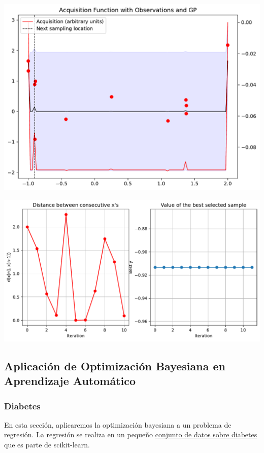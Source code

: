 \documentclass[
  12pt,
  letterpaper,
  DIV=11,
  numbers=noendperiod]{scrartcl}
\begin{document}
\includegraphics{ProyFinal_OptBayesiana_2024_files/figure-pdf/cell-10-output-1.pdf}

\includegraphics{ProyFinal_OptBayesiana_2024_files/figure-pdf/cell-11-output-1.pdf}

\subsection{Aplicación de Optimización Bayesiana en Aprendizaje
Automático}\label{aplicaciuxf3n-de-optimizaciuxf3n-bayesiana-en-aprendizaje-automuxe1tico}

\subsubsection{Diabetes}\label{diabetes}

En esta sección, aplicaremos la optimización bayesiana a un problema de
regresión. La regresión se realiza en un pequeño
\href{http://scikit-learn.org/stable/modules/generated/sklearn.datasets.load_diabetes.html\#sklearn.datasets.load_diabetes}{conjunto
de datos sobre diabetes} que es parte de scikit-learn.
\end{document}
